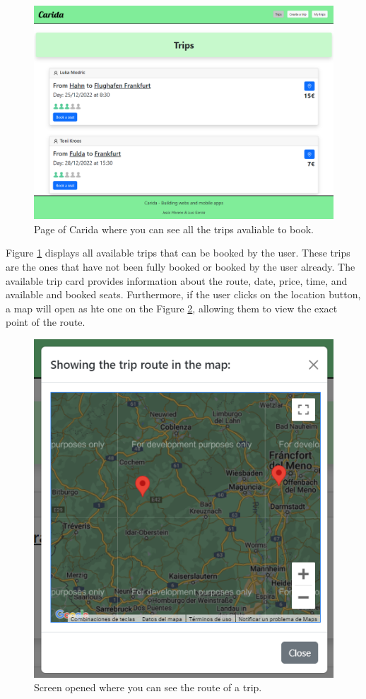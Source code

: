\documentclass{article}
\begin{document}
  \begin{figure}[h]
    \centering
    \includegraphics[width=1\columnwidth]{figures/Trips page.png}
    \caption{Page of Carida where you can see all the trips avaliable to book.\label{fig:trip page.png}}
    \end{figure}

    Figure \ref{fig:trip page.png} displays all available trips that can be booked by the user. These trips are the ones that have not been fully booked or booked by the user already. The available trip card provides information about the route, date, price, time, and available and booked seats. Furthermore, if the user clicks on the location button, a map will open as hte one on the Figure \ref{fig:map of route.png}, allowing them to view the exact point of the route.

    \begin{figure}[h]
      \centering
      \includegraphics[width=0.5\columnwidth]{figures/Map of route.png}
      \caption{Screen opened where you can see the route of a trip.\label{fig:map of route.png}}
      \end{figure}
\end{document}
